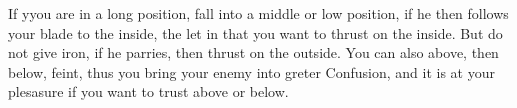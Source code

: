 \exercise{}

If yyou are in a long position, fall into a middle or low position, if
he then follows your blade to the inside, the let in that you want to
thrust on the inside. But do not give iron, if he parries, then thrust
on the outside. You can also above, then below, feint, thus you bring
your enemy into greter Confusion, and it is at your plesasure if you
want to trust above or below.
